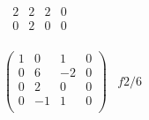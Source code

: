 \[\begin{aligned}
\begin{aligned}
\begin{array}{ccc|c}
                2 & 2 & 2 & 0 \\
                \hline
                0 & 2 & 0 & 0 \\
            \end{array}
        \end{aligned} \\ \\
        \left(
            \begin{array}{ccc|c}
                1 & 0 & 1 & 0 \\
                0 & 6 & -2 & 0 \\
                0 & 2 & 0 & 0 \\
                0 & -1 & 1 & 0 \\
            \end{array}
        \right)
        &f2/6
    \end{aligned}
\]

